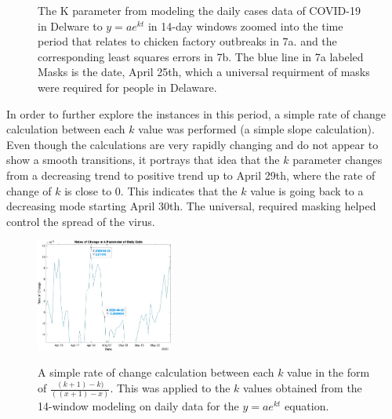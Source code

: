 \documentclass[12pt]{article}
\begin{document}
\begin{figure}[h]
  \centering
  \hfill
  \caption{The K parameter from modeling the daily cases data of COVID-19 in Delware to $y=ae^{kt}$ in 14-day windows zoomed into the time period that relates to chicken factory outbreaks in 7a. and the corresponding least squares errors in 7b. The blue line in 7a labeled Masks is the date, April 25th, which a universal requirment of masks were required for people in Delaware.}
  \label{fig:7}
\end{figure}

In order to further explore the instances in this period, a simple rate of change calculation between each $k$ value was performed (a simple slope calculation). Even though the calculations are very rapidly changing and do not appear to show a smooth transitions, it portrays that idea that the $k$ parameter changes from a decreasing trend to positive trend up to April 29th, where the rate of change of $k$ is close to 0. This indicates that the $k$ value is going back to a decreasing mode starting April 30th. The universal, required masking helped control the spread of the virus.

\begin{figure}[h]
  \centering
  \subfigure
    \includegraphics[width=0.4\textwidth]{Figure8.jpg}%
    \label{fig:a}%
  \caption{A simple rate of change calculation between each $k$ value in the form of $\frac{(k+1)-k)}{((x+1)-x)}$. This was applied to the $k$ values obtained from the 14-window modeling on daily data for the $y=ae^{kt}$ equation. }
  \label{fig:8}
\end{figure}
\end{document}
